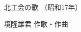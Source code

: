 \documentclass[10pt,b5j]{tarticle} %
\begin{document}
\begin{minipage}[c]{0.7\hsize} %
    \begin{center}
        {\LARGE
            北工会の歌 %
        }
        {\small 
            （昭和17年） %
        }
    \end{center}
\end{minipage}
\begin{minipage}[c]{0.3\hsize} %
    \begin{flushright} %
        境隆雄君 作歌・作曲 %
    \end{flushright}
\end{minipage}
\end{document}
